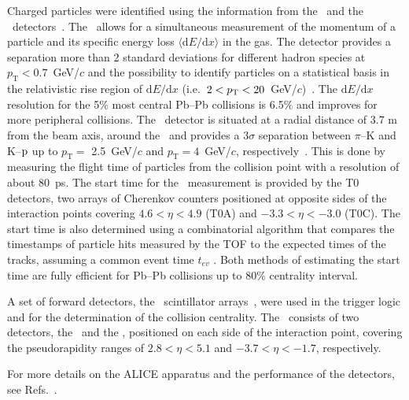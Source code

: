 Charged particles were identified using the information from the \TPC~and the \TOF~detectors~\cite{Aamodt:2008zz}. The \TPC~allows for a simultaneous measurement of the momentum of a particle and its specific energy loss $\langle \mathrm{d}E/\mathrm{d}x \rangle$ in the gas. The detector provides a separation more than 2 standard deviations for different hadron species at $p_{\mathrm{T}} < 0.7$~GeV/$c$ and the possibility to identify particles on a statistical basis in the relativistic rise region of $\mathrm{d}E/\mathrm{d}x$ (i.e.~$2 < p_{\rm{T}} < 20$~GeV/$c$)~\cite{Abelev:2014ffa}. The $\mathrm{d}E/\mathrm{d}x$ resolution for the 5$\%$ most central Pb--Pb collisions is 6.5$\%$ and improves for more peripheral collisions. The \TOF~detector is situated at a radial distance of 3.7 m from the beam axis, around the \TPC~and provides a $3\sigma$ separation between $\pi$--K and K--$\rm{p}$ up to $p_{\mathrm{T}} = $ 2.5~GeV/$c$ and $p_{\mathrm{T}} = 4$~GeV/$c$, respectively~\cite{Abelev:2014ffa}. This is done by measuring the flight time of particles from the collision point with a resolution of about $80$~ps. The start time for the \TOF~measurement is provided by the T0 detectors, two arrays of Cherenkov counters positioned at opposite sides of the interaction points covering $4.6 < \eta < 4.9$ (T0A) and $-3.3 < \eta < -3.0$ (T0C). The start time is also determined using a combinatorial algorithm that compares the timestamps of particle hits measured by the TOF to the expected times of the tracks, assuming a common event time $t_{ev}$ \cite{Abelev:2014ffa}. Both methods of estimating the start time are fully efficient for Pb--Pb collisions up to 80\% centrality interval.

A set of forward detectors, the \VZERO~scintillator arrays~\cite{Abbas:2013taa}, were used in the trigger logic and for the determination of the collision centrality. The \VZERO~consists of two detectors, the \VZEROA~and the \VZEROC, positioned on each side of the interaction point, covering the pseudorapidity ranges of $2.8 < \eta < 5.1$ and $-3.7 < \eta < -1.7$, respectively. 

For more details on the ALICE apparatus and the performance of the detectors, see Refs.~\cite{Aamodt:2008zz,Abelev:2014ffa}.
